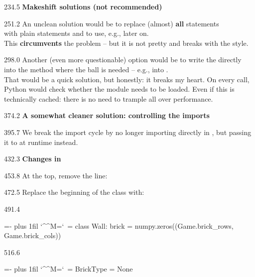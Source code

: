 \documentclass{aslab}
\makeatletter
\newcommand*\kw[1]{\textcolor{codeorange}{#1}}
\newcommand*\fn[1]{\textcolor{codecyan}{#1}}
\newenvironment{pycode}{\par\ttfamily\hyphenchar\font=-1
  \lineskiplimit=-\maxdimen\lineskip=0pt\parindent=0pt
  \parfillskip=0pt plus 1fil\relax
  \catcode`\^^M=\active\catcode`\ =\active\py@setup\py@gobble}{}
\newcommand*\emo[1]{\makebox[18bp][l]{\emoji{#1}}}
\makeatother
\begin{document}
\begin{region}{234.5}
\emo{1FA79}\textbf{Makeshift solutions (not recommended)}
\end{region}

\begin{region}[pitch=13.9]{251.2}
An unclean solution would be to replace (almost) \textbf{all}
 statements\\
with plain  statements and to use, e.g.,
 later on.\\
This \textbf{circumvents} the problem -- but it is not pretty and breaks with
the style.
\end{region}

\begin{region}[pitch=13.28]{298.0}
Another (even more questionable) option would be to write the
 directly into the method where the ball is
needed -- e.g., into .\\
That would be a quick solution, but honestly: it breaks my heart. On every
call, Python would check whether the module needs to be loaded. Even if this
is technically cached: there is no need to trample all over performance.
\end{region}

\begin{region}{374.2}
\emo{1F9FC}\textbf{A somewhat cleaner solution: controlling the imports}
\end{region}

\begin{region}[pitch=13.5]{395.7}
We break the import cycle by no longer importing  directly
in , but passing it to  at runtime instead.
\end{region}

\begin{region}{432.3}
\emo{1F9F1}\textbf{Changes in} 
\end{region}

\begin{region}{453.8}
At the top, remove the line: 
\end{region}

\begin{region}{472.5}
Replace the beginning of the class with:
\end{region}

\begin{region}[pitch=13.2]{491.4}
\begin{pycode}
\kw{class} \fn{Wall}:
    brick = numpy.zeros((Game.brick\_rows, Game.brick\_cols))
\end{pycode}
\end{region}
\begin{region}[]{516.6}
\begin{pycode}
    BrickType = \fn{None}
\end{pycode}
\end{region}
\end{document}

